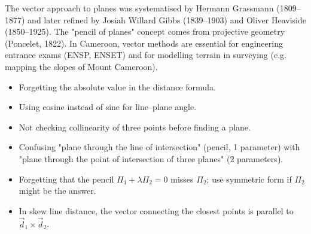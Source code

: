 \documentclass[11pt]{article}
\begin{document}
\begin{savaistu}
The vector approach to planes was systematised by Hermann Grassmann (1809–1877) and later refined by Josiah Willard Gibbs (1839–1903) and Oliver Heaviside (1850–1925). The "pencil of planes" concept comes from projective geometry (Poncelet, 1822). In Cameroon, vector methods are essential for engineering entrance exams (ENSP, ENSET) and for modelling terrain in surveying (e.g. mapping the slopes of Mount Cameroon).
\end{savaistu}

\begin{attention}
\begin{itemize}
\item Forgetting the absolute value in the distance formula.
\item Using cosine instead of sine for line–plane angle.
\item Not checking collinearity of three points before finding a plane.
\item Confusing "plane through the line of intersection" (pencil, 1 parameter) with "plane through the point of intersection of three planes" (2 parameters).
\item Forgetting that the pencil $\Pi_1+\lambda\Pi_2=0$ misses $\Pi_2$; use symmetric form if $\Pi_2$ might be the answer.
\item In skew line distance, the vector connecting the closest points is parallel to $\vec{d}_1\times\vec{d}_2$.
\end{itemize}
\end{attention}
\end{document}
